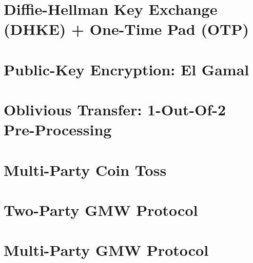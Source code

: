 \documentclass[11pt,hidelinks]{article}
\begin{document}
\section{Diffie-Hellman Key Exchange (DHKE) + One-Time Pad (OTP)}\label{sec:dhke_otp}


\section{Public-Key Encryption: El Gamal}\label{sec:el_gamal}


%

\section{Oblivious Transfer: 1-Out-Of-2 Pre-Processing}\label{sec:ot_pre}


\section{Multi-Party Coin Toss}\label{sec:coin}


\section{Two-Party GMW Protocol}\label{sec:gmw}


\section{Multi-Party GMW Protocol}\label{sec:gmwn}

\end{document}
